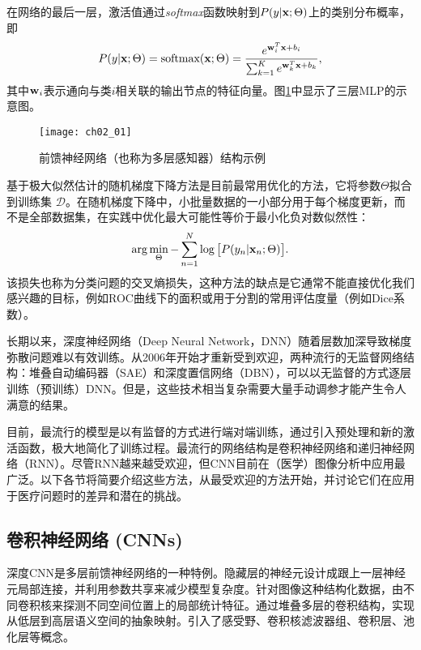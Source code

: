 在网络的最后一层，激活值通过{\it softmax}函数映射到$P(y | {\bf x}; \Theta)$上的类别分布概率，即
\begin{equation}
 P(y | {\bf x}; \Theta) = \text{softmax}({\bf x}; \Theta) = \frac{e^{{\bf w}_{i}^{T}{\bf x} + b_{i}}}{\sum^{K}_{k = 1} e^{{\bf w}_{k}^{T}{\bf x} + b_{k}}},
\end{equation}
其中${\bf w}_{i}$表示通向与类$i$相关联的输出节点的特征向量。图\ref{fig:ch02_01}中显示了三层MLP的示意图。
\begin{figure}[!htbp]
    \centering
    \texttt{[image: ch02\_01]}
    \caption{前馈神经网络（也称为多层感知器）结构示例}
    \label{fig:ch02_01}
\end{figure}

基于极大似然估计的随机梯度下降方法是目前最常用优化的方法，它将参数$\Theta$拟合到训练集 $\mathcal{D}$。在随机梯度下降中，小批量数据的一小部分用于每个梯度更新，而不是全部数据集，在实践中优化最大可能性等价于最小化负对数似然性：
\begin{equation}
 \arg \min_{\Theta} - \sum^{N}_{n = 1} \log\big[ P(y_{n}| {\bf x}_{n}; \Theta) \big].
\end{equation}
该损失也称为分类问题的交叉熵损失，这种方法的缺点是它通常不能直接优化我们感兴趣的目标，例如ROC曲线下的面积或用于分割的常用评估度量（例如Dice系数）。

长期以来，深度神经网络（Deep Neural Network，DNN）随着层数加深导致梯度弥散问题难以有效训练。从2006年开始才重新受到欢迎\citep{Hinton2006a}，两种流行的无监督网络结构：堆叠自动编码器（SAE）和深度置信网络（DBN），可以以无监督的方式逐层训练（预训练）DNN。但是，这些技术相当复杂需要大量手动调参才能产生令人满意的结果。

目前，最流行的模型是以有监督的方式进行端对端训练，通过引入预处理和新的激活函数，极大地简化了训练过程。最流行的网络结构是卷积神经网络和递归神经网络（RNN）。尽管RNN越来越受欢迎，但CNN目前在（医学）图像分析中应用最广泛。以下各节将简要介绍这些方法，从最受欢迎的方法开始，并讨论它们在应用于医疗问题时的差异和潜在的挑战。

\subsection{卷积神经网络 (CNNs)}

深度CNN是多层前馈神经网络的一种特例。隐藏层的神经元设计成跟上一层神经元局部连接，并利用参数共享来减少模型复杂度。针对图像这种结构化数据，由不同卷积核来探测不同空间位置上的局部统计特征。通过堆叠多层的卷积结构，实现从低层到高层语义空间的抽象映射。引入了感受野、卷积核滤波器组、卷积层、池化层等概念。

